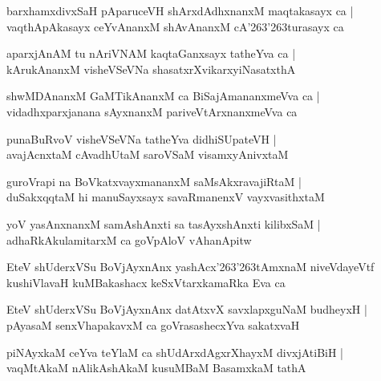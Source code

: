 \documentclass[twoside,12pt,openright]{book}
\def\S{\char'263}
\newcounter{shloka}[chapter]
\begin{document}
\begin{shloka}
barxhamxdivxSaH pAparuceVH shArxdAdhxnanxM maqtakasayx ca |\\
vaqthApAkasayx ceYvAnanxM shAvAnanxM cA\S\S turasayx ca
\end{shloka}

\begin{shloka}
aparxjAnAM tu nAriVNAM kaqtaGanxsayx tatheYva ca |\\
kArukAnanxM visheVSeVNa shasatxrXvikarxyiNasatxthA 
\end{shloka}

\begin{shloka}
shwMDAnanxM GaMTikAnanxM ca BiSajAmananxmeVva ca |\\
vidadhxparxjanana sAyxnanxM pariveVtArxnanxmeVva ca 
\end{shloka}

\begin{shloka}
punaBuRvoV visheVSeVNa tatheYva didhiSUpateVH |\\
avajAcnxtaM cAvadhUtaM saroVSaM visamxyAnivxtaM 
\end{shloka}

\begin{shloka}
guroVrapi na BoVkatxvayxmananxM saMsAkxravajiRtaM |\\
duSakxqqtaM hi manuSayxsayx savaRmanenxV vayxvasithxtaM  
\end{shloka}

\begin{shloka}
yoV yasAnxnanxM samAshAnxti sa tasAyxshAnxti kilibxSaM |\\
adhaRkAkulamitarxM ca goVpAloV vAhanApitw 
\end{shloka}

\begin{shloka}
EteV shUderxVSu BoVjAyxnAnx yashAcx\S\S tAmxnaM niveVdayeVtf \\
kushiVlavaH kuMBakashacx keSxVtarxkamaRka Eva ca 
\end{shloka}

\begin{shloka}
EteV shUderxVSu BoVjAyxnAnx datAtxvX savxlapxguNaM budheyxH |\\
pAyasaM senxVhapakavxM ca goVrasashecxYva sakatxvaH 
\end{shloka}

\begin{shloka}
piNAyxkaM ceYva teYlaM ca shUdArxdAgxrXhayxM divxjAtiBiH |\\
vaqMtAkaM nAlikAshAkaM kusuMBaM BasamxkaM tathA 
\end{shloka}
\end{document}
